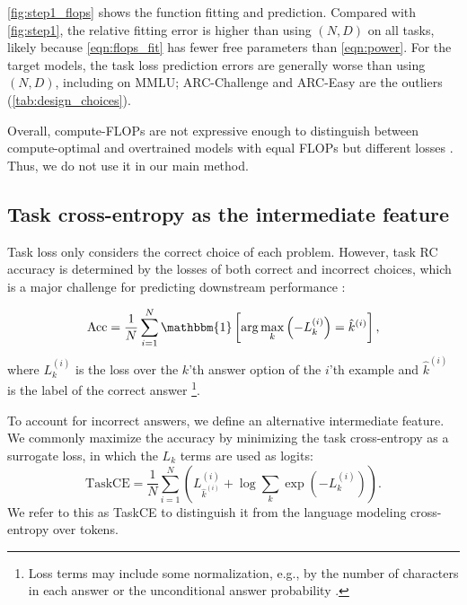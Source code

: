 \autoref{fig:step1_flops} shows the function fitting and prediction.
Compared with \autoref{fig:step1}, the relative fitting error is higher than using $(N, D)$ on all tasks, likely because \autoref{eqn:flops_fit} has fewer free parameters than \autoref{eqn:power}.
For the target models, the task loss prediction errors are generally worse than using $(N, D)$, including on MMLU; ARC-Challenge and ARC-Easy are the outliers (\autoref{tab:design_choices}).

Overall, compute-FLOPs are not expressive enough to distinguish between compute-optimal and overtrained models with equal FLOPs but different losses \citep{Hoffmann2022TrainingCL}.
Thus, we do not use it in our main method.


\subsection{Task cross-entropy as the intermediate feature}
\label{app:task_ce}

Task loss only considers the correct choice of each problem. However, task RC accuracy is determined by the losses of both correct and incorrect choices, which is a major challenge for predicting downstream performance \citep{schaeffer2024why}:

\begin{equation} \label{eqn:task_acc}
\text{Acc} = \frac{1}{N} \sum_{i=1}^N \mathbbm{1} \left[ \arg\max_{k} \left( {-L_k^{(i)}} \right) = \hat k^{(i)} \right],
\end{equation}
where $L_k^{(i)}$ is the loss over the $k$'th answer option of the $i$'th example and $\hat k^{(i)}$ is the label of the correct answer \footnote{Loss terms may include some normalization, e.g., by the number of characters in each answer or the unconditional answer probability \citep{gu2024olmes}.}. 

To account for incorrect answers, we define an alternative intermediate feature. We commonly maximize the accuracy by minimizing the task cross-entropy as a surrogate loss, in which the $L_k$ terms are used as logits:
\begin{equation} \label{eqn:task_ce}
\text{TaskCE} = \frac{1}{N} \sum_{i=1}^N \left( {L^{(i)}_{\hat k^{(i)}}} + \log {\sum_k \exp \left( -L^{(i)}_{k} \right) } \right).
\end{equation}
We refer to this as TaskCE to distinguish it from the language modeling cross-entropy over tokens.

